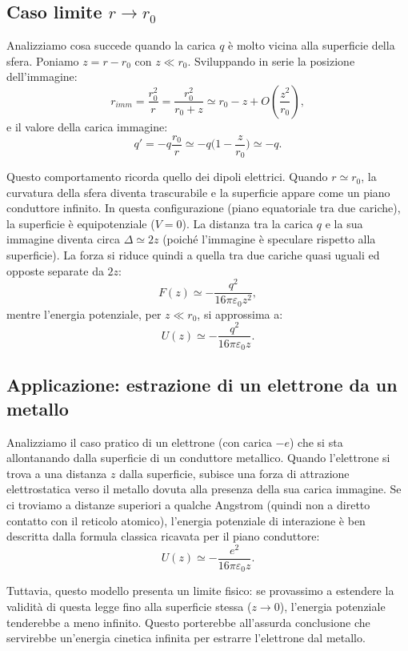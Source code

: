 \documentclass{book}
\begin{document}
\subsection{Caso limite \texorpdfstring{$r\to r_0$}{r→r0}}

Analizziamo cosa succede quando la carica $q$ è molto vicina alla superficie della sfera.
Poniamo $z=r-r_0$ con $z \ll r_0$. Sviluppando in serie la posizione dell'immagine:
\[
r_{imm}=\frac{r_0^{2}}{r}=\frac{r_0^{2}}{r_0+z}\simeq r_0 - z + O\!\left(\frac{z^{2}}{r_0}\right),
\]
e il valore della carica immagine:
\[
q'=-q\frac{r_0}{r}\simeq -q\Big(1-\frac{z}{r_0}\Big)\simeq -q.
\]

Questo comportamento ricorda quello dei dipoli elettrici. Quando $r \simeq r_0$, la curvatura della sfera diventa trascurabile e la superficie appare come un piano conduttore infinito. In questa configurazione (piano equatoriale tra due cariche), la superficie è equipotenziale ($V=0$).
La distanza tra la carica $q$ e la sua immagine diventa circa $\Delta \simeq 2z$ (poiché l'immagine è speculare rispetto alla superficie).
La forza si riduce quindi a quella tra due cariche quasi uguali ed opposte separate da $2z$:
\[
F(z)\simeq -\frac{q^{2}}{16\pi\varepsilon_0 z^{2}},
\]
mentre l'energia potenziale, per $z\ll r_0$, si approssima a:
\[
U(z)\simeq -\frac{q^{2}}{16\pi\varepsilon_0 z}.
\]
\subsection{Applicazione: estrazione di un elettrone da un metallo}

Analizziamo il caso pratico di un elettrone (con carica $-e$) che si sta allontanando dalla superficie di un conduttore metallico.
Quando l'elettrone si trova a una distanza $z$ dalla superficie, subisce una forza di attrazione elettrostatica verso il metallo dovuta alla presenza della sua carica immagine. Se ci troviamo a distanze superiori a qualche Angstrom (quindi non a diretto contatto con il reticolo atomico), l'energia potenziale di interazione è ben descritta dalla formula classica ricavata per il piano conduttore:
\[
U(z)\simeq -\frac{e^{2}}{16\pi\varepsilon_0 z}.
\]

Tuttavia, questo modello presenta un limite fisico: se provassimo a estendere la validità di questa legge fino alla superficie stessa ($z \to 0$), l'energia potenziale tenderebbe a meno infinito. Questo porterebbe all'assurda conclusione che servirebbe un'energia cinetica infinita per estrarre l'elettrone dal metallo.
\end{document}

